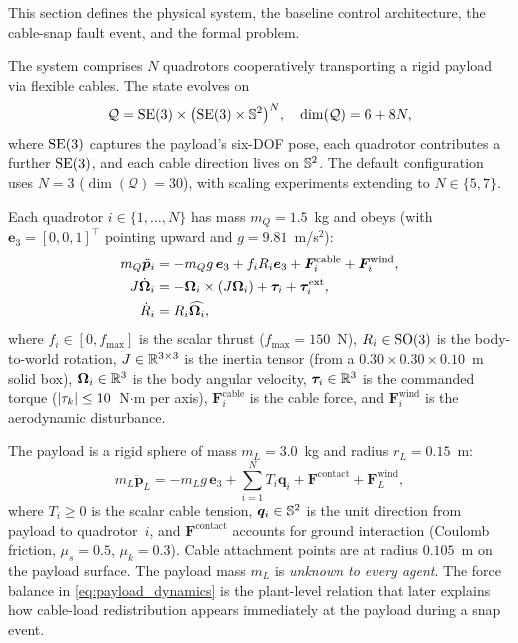 
This section defines the physical system, the baseline control architecture, the cable-snap fault event, and the formal problem.


The system comprises $N$ quadrotors cooperatively transporting a rigid payload via flexible cables. The state evolves on
\begin{equation}\label{eq:config_manifold}
  \mathcal{Q} = \mathrm{SE}(3) \times \bigl(\mathrm{SE}(3) \times \mathbb{S}^2\bigr)^N, \quad \dim(\mathcal{Q}) = 6 + 8N,
\end{equation}
where $\mathrm{SE}(3)$ captures the payload's six-DOF pose, each quadrotor contributes a further $\mathrm{SE}(3)$, and each cable direction lives on $\mathbb{S}^2$. The default configuration uses $N = 3$ ($\dim(\mathcal{Q}) = 30$), with scaling experiments extending to $N \in \{5, 7\}$.


Each quadrotor $i \in \{1,\dots,N\}$ has mass $m_Q = 1.5$~kg and obeys (with $\bm{e}_3 = [0,0,1]^\top$ pointing upward and $g = 9.81$~m/s$^2$):
\begin{align}
  m_Q \ddot{\bm{p}}_i &= -m_Q g\,\bm{e}_3 + f_i R_i \bm{e}_3 + \bm{F}_i^{\mathrm{cable}} + \bm{F}_i^{\mathrm{wind}}, \label{eq:quad_trans} \\
  J \dot{\bm{\Omega}}_i &= -\bm{\Omega}_i \times (J\bm{\Omega}_i) + \bm{\tau}_i + \bm{\tau}_i^{\mathrm{ext}}, \label{eq:quad_rot} \\
  \dot{R}_i &= R_i \widehat{\bm{\Omega}_i}, \label{eq:quad_kin}
\end{align}
where $f_i \in [0, f_{\max}]$ is the scalar thrust ($f_{\max} = 150$~N), $R_i \in \mathrm{SO}(3)$ is the body-to-world rotation, $J \in \mathbb{R}^{3 \times 3}$ is the inertia tensor (from a $0.30 \times 0.30 \times 0.10$~m solid box), $\bm{\Omega}_i \in \mathbb{R}^3$ is the body angular velocity, $\bm{\tau}_i \in \mathbb{R}^3$ is the commanded torque ($\lvert \tau_k \rvert \leq 10$~N$\cdot$m per axis), $\bm{F}_i^{\mathrm{cable}}$ is the cable force, and $\bm{F}_i^{\mathrm{wind}}$ is the aerodynamic disturbance.

The payload is a rigid sphere of mass $m_L = 3.0$~kg and radius $r_L = 0.15$~m:
\begin{equation}\label{eq:payload_dynamics}
  m_L \ddot{\bm{p}}_L = -m_L g\,\bm{e}_3 + \textstyle\sum_{i=1}^{N} T_i \bm{q}_i + \bm{F}^{\mathrm{contact}} + \bm{F}_L^{\mathrm{wind}},
\end{equation}
where $T_i \geq 0$ is the scalar cable tension, $\bm{q}_i \in \mathbb{S}^2$ is the unit direction from payload to quadrotor~$i$, and $\bm{F}^{\mathrm{contact}}$ accounts for ground interaction (Coulomb friction, $\mu_s = 0.5$, $\mu_k = 0.3$). Cable attachment points are at radius $0.105$~m on the payload surface. The payload mass $m_L$ is \emph{unknown to every agent}.
The force balance in \eqref{eq:payload_dynamics} is the plant-level relation that later explains how cable-load redistribution appears immediately at the payload during a snap event.



